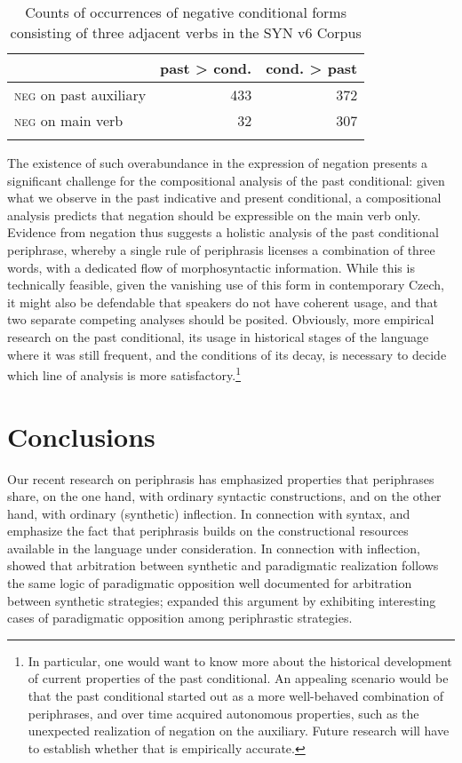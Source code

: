 \documentclass[output=paper]{langsci/langscibook}
\begin{document}
\begin{table}
\begin{tabular}{lrr}
\lsptoprule
& past > cond. &  cond. > past\\
\midrule
\textsc{neg} on past auxiliary & 433 & 372\\
\textsc{neg} on main verb & 32 & 307\\
\lspbottomrule
\end{tabular}
\caption{Counts of occurrences of negative conditional forms consisting of three adjacent verbs in the   SYN v6 Corpus \citep{SYN}\label{tab:counts}}
\end{table}


The existence of such overabundance \citep{Thornton12} in the expression of negation presents a significant challenge for the compositional analysis of the past conditional: given what we observe in the past indicative and present conditional, a compositional analysis predicts that negation should be expressible on the main verb only. Evidence from negation thus suggests a holistic analysis of the past conditional periphrase, whereby a single rule of periphrasis licenses a combination of three words, with a dedicated flow of morphosyntactic information. While this is technically feasible, given the vanishing use of this form in contemporary Czech, it might also be defendable that speakers do not have coherent usage, and that two separate competing analyses should be posited. Obviously, more empirical research on the past conditional, its usage in historical stages of the language where it was still frequent, and the conditions of its decay, is necessary to decide which line of analysis is more satisfactory.\footnote{In particular, one would want to know more about the historical development of current properties of the past conditional. An appealing scenario would be that the past conditional started out as a more well-behaved combination of periphrases, and over time acquired autonomous properties, such as the unexpected realization of negation on the auxiliary. Future research will have to establish whether that is empirically accurate.}



\section{Conclusions}

Our recent research on periphrasis has emphasized properties that periphrases share, on the one hand, with ordinary syntactic constructions, and on the other hand, with ordinary (synthetic) inflection. In connection with syntax, \citet{Bonami13} and \citet{Bonami15} emphasize the fact that periphrasis builds on the constructional resources available in the language under consideration. In connection with inflection, \citet{Bonami14d} showed that arbitration between synthetic and paradigmatic realization follows the same logic of paradigmatic opposition well documented for arbitration between synthetic strategies; \citet{Stichauer18} expanded this argument by exhibiting interesting cases of paradigmatic opposition among periphrastic strategies.
\end{document}
